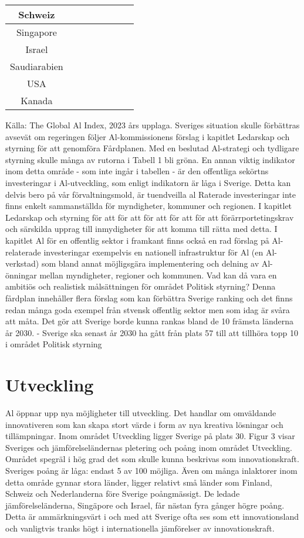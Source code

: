 {{{{{{{{{{{{{{{{{{\begin{tabular}{|c|c|c|c|c|c|c|c|}
\hline Schweiz & & & & & & & \\
\hline Singapore & & & & & & & \\
\hline Israel & & & & & & & \\
\hline Saudiarabien & & & & & & & \\
\hline USA & & & & & & & \\
\hline Kanada & & & & & & & \\
\hline
\end{tabular}
Källa: The Global Al Index, 2023 års upplaga.
Sveriges situation skulle förbättras avsevät om regeringen följer Al-kommissionens förslag i kapitlet Ledarskap och styrning för att genomföra Fårdplanen. Med en beslutad Al-strategi och tydligare styrning skulle många av rutorna i Tabell 1 bli gröna.
En annan viktig indikator inom detta område - som inte ingår i tabellen - är den offentliga sekörtns investeringar i Al-utveckling, som enligt indikatorn är låga i Sverige. Detta kan delvis bero på vår förvaltningsmold, är tuendveilla al Raterade investeringar inte finns enkelt sammanställda för myndigheter, kommuner och regionen. I kapitlet Ledarskap och styrning för att för att för att för att för att förärrportetingskrav och särskilda upprag till inmydigheter för att komma till rätta med detta. I kapitlet Al för en offentlig sektor i framkant finns också en rad förslag på Al-relaterade investeringar exempelvis en nationell infrastruktur för Al (en Al-verkstad) som bland annat möjligsgära implementering och delning av Al-önningar mellan myndigheter, regioner och kommunen.
Vad kan då vara en ambitiös och realistisk målsättningen för området Politisk styrning? Denna fårdplan innehåller flera förslag som kan förbättra Sverige ranking och det finns redan många goda exempel från stvensk offentlig sektor men som idag är svåra att måta. Det gör att Sverige borde kunna rankas bland de 10 främsta länderna år 2030.
- Sverige ska senast år 2030 ha gått från plats 57 till att tillhöra topp 10 i området Politisk styrning
\section*{Utveckling}
Al öppnar upp nya möjligheter till utveckling. Det handlar om omväldande innovativeren som kan skapa stort värde i form av nya kreativa lösningar och tillämpningar. Inom området Utveckling ligger Sverige på plats 30.
Figur 3 visar Sveriges och jämförelseländernas pletering och poång inom området Utveckling. Området spegräl i hög grad det som skulle kunna beskrivas som innovationskraft. Sveriges poång är låga: endast 5 av 100 möjliga. Även om många inlaktorer inom detta område gynnar stora länder, ligger relativt små länder som Finland, Schweiz och Nederlanderna före Sverige poångmässigt. De ledade jämförelseländerna, Singäpore och Israel, får nästan fyra gånger högre poång. Detta är ammärkningsvärt i och med att Sverige ofta ses som ett innovationsland och vanligtvis tranks högt i internationella jämförelser av innovationskraft.

}}}}}}}}}}}}}}}}}}
